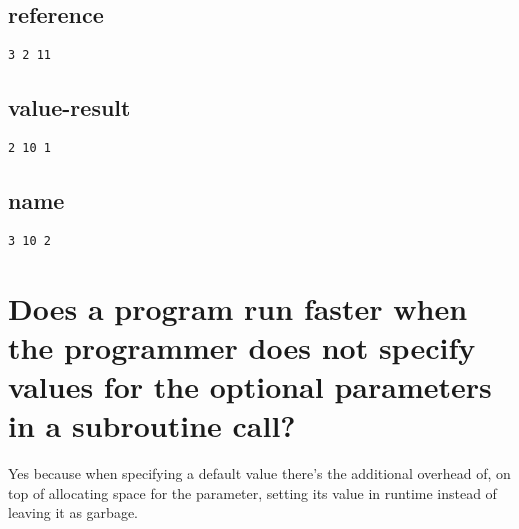 \documentclass[letterpaper]{article}
\begin{document}
\subsection{reference}
\begin{adjustwidth}{2.35em}{0pt}
\begin{Verbatim}
3 2 11
\end{Verbatim}
\end{adjustwidth}
\subsection{value-result}
\begin{adjustwidth}{2.35em}{0pt}
\begin{Verbatim}
2 10 1
\end{Verbatim}
\end{adjustwidth}
\subsection{name}
\begin{adjustwidth}{2.35em}{0pt}
\begin{Verbatim}
3 10 2
\end{Verbatim}
\end{adjustwidth}

\section{Does a program run faster when the programmer does not specify values for the optional parameters in a subroutine call?}
\begin{adjustwidth}{2.35em}{0pt}
Yes because when specifying a default value there's the additional overhead of, on top of allocating space for the parameter, setting its value in runtime instead of leaving it as garbage.
\end{adjustwidth}
\end{document}

